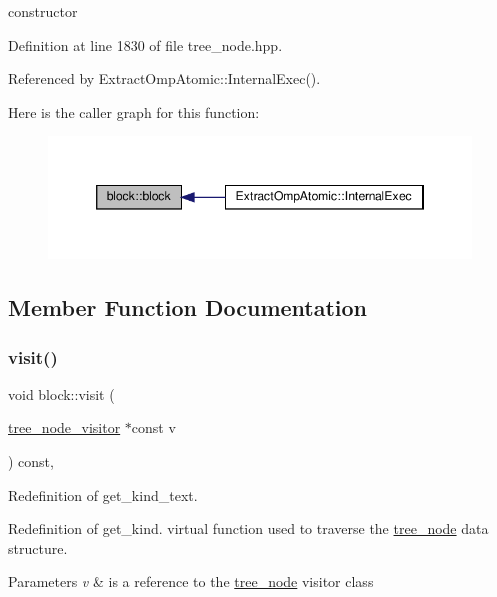 constructor 



Definition at line 1830 of file tree\+\_\+node.\+hpp.



Referenced by Extract\+Omp\+Atomic\+::\+Internal\+Exec().

Here is the caller graph for this function\+:
\nopagebreak
\begin{figure}[H]
\begin{center}
\leavevmode
\includegraphics[width=346pt]{d1/d7f/structblock_ae28c301a1664fe41e9755c141b697d62_icgraph}
\end{center}
\end{figure}


\subsection{Member Function Documentation}
\mbox{\label{structblock_a637ca9811cf1cf93dd10c10cb174b9c4}} 
\subsubsection{\texorpdfstring{visit()}{visit()}}
{\footnotesize\ttfamily void block\+::visit (\begin{DoxyParamCaption}\item[{\hyperlink{classtree__node__visitor}{tree\+\_\+node\+\_\+visitor} $\ast$const}]{v }\end{DoxyParamCaption}) const\hspace{0.3cm}{\ttfamily [override]}, {\ttfamily [virtual]}}



Redefinition of get\+\_\+kind\+\_\+text. 

Redefinition of get\+\_\+kind. virtual function used to traverse the \hyperlink{classtree__node}{tree\+\_\+node} data structure. 
\begin{DoxyParams}{Parameters}
{\em v} & is a reference to the \hyperlink{classtree__node}{tree\+\_\+node} visitor class \\
\hline
\end{DoxyParams}


